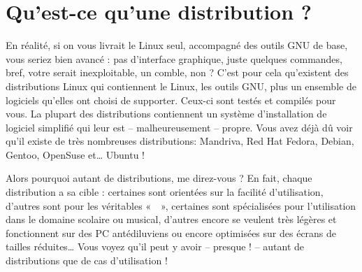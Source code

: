 \section{Qu'est-ce qu'une distribution ?}
En réalité, si on vous livrait le  Linux seul, accompagné des outils GNU de base, vous seriez bien avancé : pas d'interface graphique, juste quelques commandes, bref, votre  serait inexploitable, un comble, non ? C'est pour cela qu'existent des distributions Linux qui contiennent le  Linux, les outils GNU, plus un ensemble de logiciels qu'elles ont choisi de supporter. Ceux-ci sont testés et compilés pour vous. La plupart des distributions contiennent un système d'installation de logiciel simplifié qui leur est -- malheureusement -- propre. Vous avez déjà dû voir qu'il existe de très nombreuses distributions: Mandriva, Red Hat Fedora, Debian, Gentoo, OpenSuse et\ldots{} Ubuntu !\par
Alors pourquoi autant de distributions, me direz-vous ? En fait, chaque distribution a sa cible : certaines sont orientées sur la facilité d'utilisation, d'autres sont pour les véritables «~~», certaines sont spécialisées pour l'utilisation dans le domaine scolaire ou musical, d'autres encore se veulent très légères et fonctionnent sur des PC antédiluviens ou encore optimisées sur des écrans de tailles réduites\ldots{} Vous voyez qu'il peut y avoir -- presque ! -- autant de distributions que de cas d'utilisation !\par
